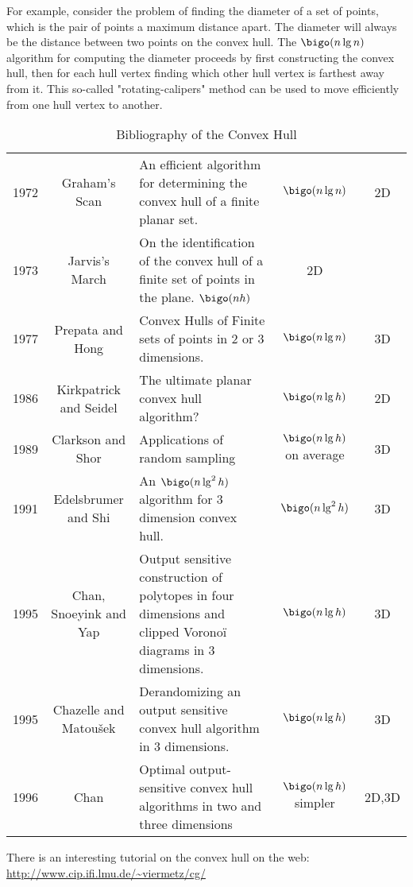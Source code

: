 \begin{LONG}
  For example, consider the problem of finding the diameter of a set
  of points, which is the pair of points a maximum distance apart.
  The diameter will always be the distance between two points on the
  convex hull.
  The $\bigo(n\lg n)$ algorithm for computing the diameter proceeds
  by first constructing the convex hull, then for each hull vertex
  finding which other hull vertex is farthest away from it.
  This so-called "rotating-calipers" method can be used to move
  efficiently from one hull vertex to another.


  \begin{table}
    \centering
    \begin{tabular}{ccp{5cm}cc}
      1972 &
      Graham's Scan &
      An efficient algorithm for determining the convex hull of a finite planar set. &
      $\bigo(n\lg n)$ &
      2D
      \\
      1973 &
      Jarvis's March &
      On the identification of the convex hull of a finite set of points in the plane.
      $\bigo (nh)$  &
      2D
      \\
      1977&
      Prepata and Hong &
      Convex Hulls of Finite sets of points in 2 or 3 dimensions. &
      $\bigo(n\lg n)$ &
      3D
      \\
      1986 &
      Kirkpatrick and Seidel \cite{kirkpatrick}&
      The ultimate planar convex hull algorithm? &
      $\bigo(n\lg h)$ &
      2D
      \\
      1989 &
      Clarkson and Shor &
      Applications of random sampling &
      $\bigo(n\lg h)$ on average &
      3D
      \\
      1991 &
      Edelsbrumer and Shi &
      An $\bigo(n\lg^2 h)$ algorithm for 3 dimension convex hull. &
      $\bigo(n\lg^2 h)$ &
      3D
      \\
      1995 &
      Chan, Snoeyink and Yap \cite{chan95outputsensitive} &
      Output sensitive construction of polytopes in four dimensions and clipped Vorono\"i diagrams in 3 dimensions. &
      $\bigo(n\lg h)$ &
      3D
      \\
      1995 &
      Chazelle and Matou\v{s}ek &
      Derandomizing an output sensitive convex hull algorithm in 3 dimensions. &
      $\bigo(n\lg h)$ &
      3D
      \\
      1996 &
      Chan \cite{chan96optimal}&
      Optimal output-sensitive convex hull algorithms in two and three dimensions &
      $\bigo(n\lg h)$ simpler &
      2D,3D
      \\
    \end{tabular}
    \caption{Bibliography of the Convex Hull}
    \label{tab:biblioConvexHull}
  \end{table}

There is an interesting tutorial on the convex hull  on the web: \url{http://www.cip.ifi.lmu.de/~viermetz/cg/}

\end{LONG}


